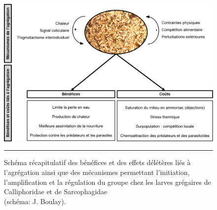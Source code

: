 \begin{figure}[ht]
\centering
		\includegraphics[width=0.9 \textwidth]{Figures/schema.png}
		\rule{35em}{0.5pt}
		\caption[Schema]{Schéma récapitulatif des bénéfices et des effets
délétères liés à l’agrégation ainsi que des mécanismes permettant l’initiation, l’amplification et la régulation du groupe chez les larves grégaires de Calliphoridae et de Sarcophagidae \\ (schéma: J. Boulay).}
	\label{fig:schema}
\end{figure}

\clearpage